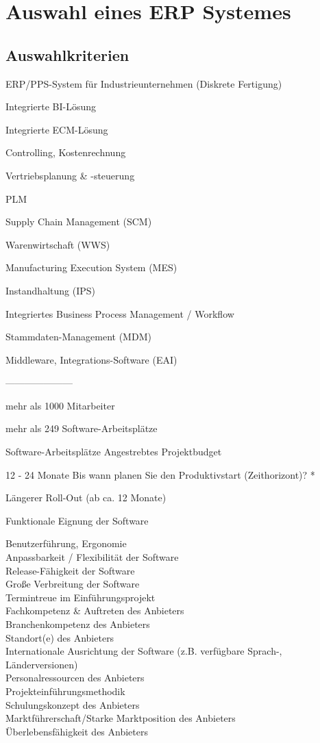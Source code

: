 \documentclass[12pt]{article}
\begin{document}
\section{Auswahl eines ERP Systemes}
\subsection{Auswahlkriterien}

ERP/PPS-System für Industrieunternehmen (Diskrete Fertigung)

Integrierte BI-Lösung

Integrierte ECM-Lösung

Controlling, Kostenrechnung

Vertriebsplanung & -steuerung

PLM

Supply Chain Management (SCM)


Warenwirtschaft (WWS)


Manufacturing Execution System (MES)


Instandhaltung (IPS)


Integriertes Business Process Management / Workflow


Stammdaten-Management (MDM)


Middleware, Integrations-Software (EAI)


---------------------

mehr als 1000 Mitarbeiter

mehr als 249 Software-Arbeitsplätze

Software-Arbeitsplätze Angestrebtes Projektbudget

12 - 24 Monate Bis wann planen Sie den Produktivstart (Zeithorizont)? *

Längerer Roll-Out (ab ca. 12 Monate)


Funktionale Eignung der Software

Benutzerführung, Ergonomie\\
Anpassbarkeit / Flexibilität der Software\\
Release-Fähigkeit der Software\\

Große Verbreitung der Software\\

Termintreue im Einführungsprojekt\\
Fachkompetenz & Auftreten des Anbieters\\

Branchenkompetenz des Anbieters\\
Standort(e) des Anbieters\\
Internationale Ausrichtung der Software (z.B. verfügbare Sprach-, Länderversionen)	\\
Personalressourcen des Anbieters	\\
Projekteinführungsmethodik\\
Schulungskonzept des Anbieters	\\
Marktführerschaft/Starke Marktposition des Anbieters	\\
Überlebensfähigkeit des Anbieters	
\end{document}
